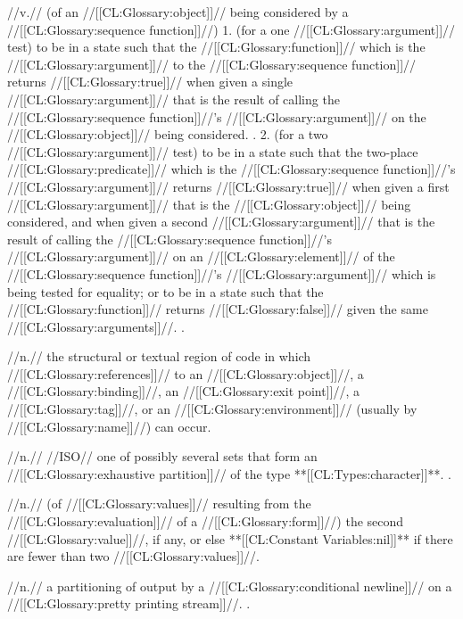  //v.// (of an //[[CL:Glossary:object]]// being considered by a //[[CL:Glossary:sequence function]]//) 1. (for a one //[[CL:Glossary:argument]]// test) to be in a state such that the //[[CL:Glossary:function]]// which is the  //[[CL:Glossary:argument]]// to the //[[CL:Glossary:sequence function]]// returns //[[CL:Glossary:true]]// when given a single //[[CL:Glossary:argument]]// that is the result of calling the //[[CL:Glossary:sequence function]]//'s  //[[CL:Glossary:argument]]// on the //[[CL:Glossary:object]]// being considered. \Seesection\SatisfyingTheOneArgTest. 2. (for a two //[[CL:Glossary:argument]]// test) to be in a state such that the two-place //[[CL:Glossary:predicate]]// which is the //[[CL:Glossary:sequence function]]//'s  //[[CL:Glossary:argument]]// returns //[[CL:Glossary:true]]// when given a first //[[CL:Glossary:argument]]// that is the //[[CL:Glossary:object]]// being considered, and when given a second //[[CL:Glossary:argument]]// that is the result of calling the //[[CL:Glossary:sequence function]]//'s  //[[CL:Glossary:argument]]// on an //[[CL:Glossary:element]]// of the //[[CL:Glossary:sequence function]]//'s  //[[CL:Glossary:argument]]// which is being tested for equality; or to be in a state such that the  //[[CL:Glossary:function]]// returns //[[CL:Glossary:false]]// given the same //[[CL:Glossary:arguments]]//. \Seesection\SatisfyingTheTwoArgTest.

 //n.// the structural or textual region of code in which //[[CL:Glossary:references]]// to an //[[CL:Glossary:object]]//, a //[[CL:Glossary:binding]]//, an //[[CL:Glossary:exit point]]//, a //[[CL:Glossary:tag]]//, or an //[[CL:Glossary:environment]]// (usually by //[[CL:Glossary:name]]//) can occur.

 //n.// //ISO// one of possibly several sets that form an //[[CL:Glossary:exhaustive partition]]// of the type **[[CL:Types:character]]**. \Seesection\CharScripts.

 //n.// (of //[[CL:Glossary:values]]// resulting from the //[[CL:Glossary:evaluation]]// of a //[[CL:Glossary:form]]//) the second //[[CL:Glossary:value]]//, if any, or else **[[CL:Constant Variables:nil]]** if there are fewer than two //[[CL:Glossary:values]]//. 

 //n.// a partitioning of output by a //[[CL:Glossary:conditional newline]]// on a //[[CL:Glossary:pretty printing stream]]//. \Seesection\DynamicControlofOutput.

